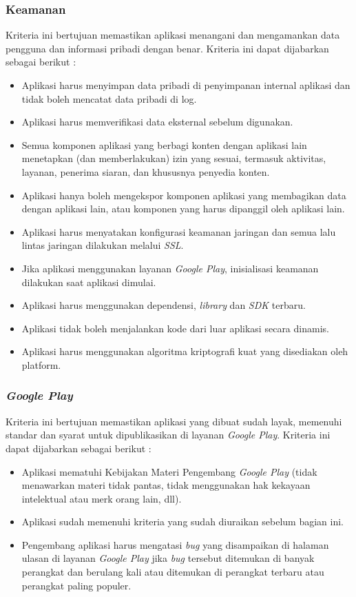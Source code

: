 \subsubsection{Keamanan}
Kriteria ini bertujuan memastikan aplikasi menangani dan mengamankan data pengguna dan informasi pribadi dengan benar\cite{androiddev}. Kriteria ini dapat dijabarkan sebagai berikut :
\begin{itemize}
    \item Aplikasi harus menyimpan data pribadi di penyimpanan internal aplikasi dan tidak boleh mencatat data pribadi di log.
    \item Aplikasi harus memverifikasi data eksternal sebelum digunakan.
    \item Semua komponen aplikasi yang berbagi konten dengan aplikasi lain menetapkan (dan memberlakukan) izin yang sesuai, termasuk aktivitas, layanan, penerima siaran, dan khususnya penyedia konten.
    \item Aplikasi hanya boleh mengekspor komponen aplikasi yang membagikan data dengan aplikasi lain, atau komponen yang harus dipanggil oleh aplikasi lain.
    \item Aplikasi harus menyatakan konfigurasi keamanan jaringan dan semua lalu lintas jaringan dilakukan melalui \textit{SSL}.
    \item Jika aplikasi menggunakan layanan \textit{Google Play}, inisialisasi keamanan dilakukan saat aplikasi dimulai.
    \item Aplikasi harus menggunakan dependensi, \textit{library} dan \textit{SDK} terbaru.
    \item Aplikasi tidak boleh menjalankan kode dari luar aplikasi secara dinamis.
    \item Aplikasi harus menggunakan algoritma kriptografi kuat yang disediakan oleh platform.
\end{itemize}       

\subsubsection{\textit{Google Play}}
Kriteria ini bertujuan memastikan aplikasi yang dibuat sudah layak, memenuhi standar dan syarat untuk dipublikasikan di layanan \textit{Google Play}\cite{androiddev}. Kriteria ini dapat dijabarkan sebagai berikut :
\begin{itemize}
    \item Aplikasi mematuhi Kebijakan Materi Pengembang \textit{Google Play} (tidak menawarkan materi tidak pantas, tidak menggunakan hak kekayaan intelektual atau merk orang lain, dll).
    \item Aplikasi sudah memenuhi kriteria yang sudah diuraikan sebelum bagian ini.
    \item Pengembang aplikasi harus mengatasi \textit{bug} yang disampaikan di halaman ulasan di layanan \textit{Google Play} jika \textit{bug} tersebut ditemukan di banyak perangkat dan berulang kali atau ditemukan di perangkat terbaru atau perangkat paling populer.    
\end{itemize}  


